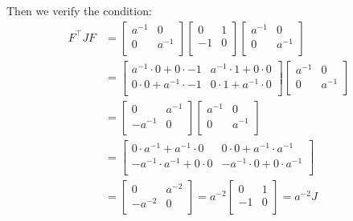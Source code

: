\documentclass[titlepage]{article}
\begin{document}
Then we verify the condition:
\begin{equation}
	\begin{split}
		F^\top JF&=
		\begin{bmatrix}
			a^{-1} & 0 \\
			0 & a^{-1} \\
		\end{bmatrix}
		\begin{bmatrix}
			0 & 1 \\
			-1 & 0 \\
		\end{bmatrix}
		\begin{bmatrix}
			a^{-1} & 0 \\
			0 & a^{-1} \\
		\end{bmatrix} \\
		&=
		\begin{bmatrix}
			a^{-1}\cdot0+0\cdot-1 & a^{-1}\cdot1+0\cdot0 \\
			0\cdot0+a^{-1}\cdot-1 & 0\cdot1+a^{-1}\cdot0 \\
		\end{bmatrix}
		\begin{bmatrix}
			a^{-1} & 0 \\
			0 & a^{-1} \\
		\end{bmatrix} \\
		&=
		\begin{bmatrix}
			0 & a^{-1} \\
			-a^{-1} & 0 \\
		\end{bmatrix}
		\begin{bmatrix}
			a^{-1} & 0 \\
			0 & a^{-1} \\
		\end{bmatrix} \\
		&=
		\begin{bmatrix}
			0\cdot a^{-1}+a^{-1}\cdot0 & 0\cdot0+a^{-1}\cdot a^{-1} \\
			-a^{-1}\cdot a^{-1}+0\cdot0 & -a^{-1}\cdot0+0\cdot a^{-1} \\
		\end{bmatrix} \\
		&=
		\begin{bmatrix}
			0 & a^{-2} \\
			-a^{-2} & 0 \\
		\end{bmatrix}=a^{-2}
		\begin{bmatrix}
			0 & 1 \\
			-1 & 0 \\
		\end{bmatrix}=a^{-2}J
	\end{split}
\end{equation}
\end{document}
